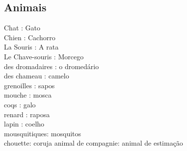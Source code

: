 \documentclass{article}
\begin{document}
    
    \subsection{Animais}
                    Chat         : Gato\\
                    Chien        : Cachorro\\
                La  Souris       : A rata\\
                Le  Chave-souris : Morcego\\
                des dromadaires  : o dromedário\\
                des chameau      : camelo\\
                    grenoilles   : sapos\\
                    mouche       : mosca\\
                    coqs         : galo\\
                    renard       : raposa\\
                    lapin        : coelho\\
                    mousquitiques: mosquitos\\
                    chouette: coruja
                    animal de compagnie: animal de estimação

    
\end{document}
